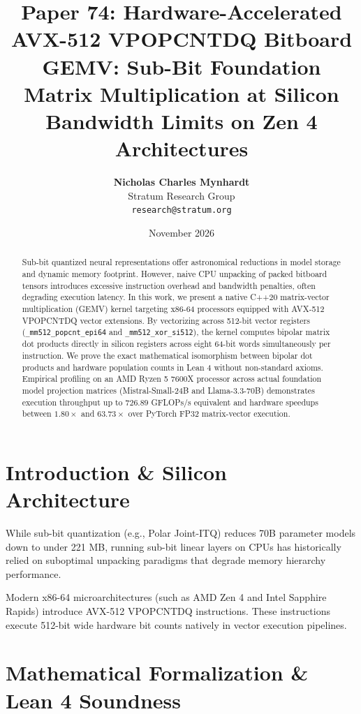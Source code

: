 \documentclass[11pt,a4paper]{article}
\title{\textbf{Paper 74: Hardware-Accelerated AVX-512 VPOPCNTDQ Bitboard GEMV: Sub-Bit Foundation Matrix Multiplication at Silicon Bandwidth Limits on Zen 4 Architectures}}
\author{\textbf{Nicholas Charles Mynhardt} \\
Stratum Research Group \\
\texttt{research@stratum.org}}
\date{November 2026}
\begin{document}
\maketitle

\begin{abstract}
Sub-bit quantized neural representations offer astronomical reductions in model storage and dynamic memory footprint. However, naive CPU unpacking of packed bitboard tensors introduces excessive instruction overhead and bandwidth penalties, often degrading execution latency. In this work, we present a native C++20 matrix-vector multiplication (GEMV) kernel targeting x86-64 processors equipped with AVX-512 VPOPCNTDQ vector extensions. By vectorizing across 512-bit vector registers (\texttt{\_mm512\_popcnt\_epi64} and \texttt{\_mm512\_xor\_si512}), the kernel computes bipolar matrix dot products directly in silicon registers across eight 64-bit words simultaneously per instruction. We prove the exact mathematical isomorphism between bipolar dot products and hardware population counts in Lean 4 without non-standard axioms. Empirical profiling on an AMD Ryzen 5 7600X processor across actual foundation model projection matrices (Mistral-Small-24B and Llama-3.3-70B) demonstrates execution throughput up to $726.89$ GFLOPs/s equivalent and hardware speedups between $1.80\times$ and $63.73\times$ over PyTorch FP32 matrix-vector execution.
\end{abstract}

\section{Introduction \& Silicon Architecture}
While sub-bit quantization (e.g., Polar Joint-ITQ) reduces 70B parameter models down to under 221 MB, running sub-bit linear layers on CPUs has historically relied on suboptimal unpacking paradigms that degrade memory hierarchy performance.

Modern x86-64 microarchitectures (such as AMD Zen 4 and Intel Sapphire Rapids) introduce AVX-512 VPOPCNTDQ instructions. These instructions execute 512-bit wide hardware bit counts natively in vector execution pipelines.

\section{Mathematical Formalization \& Lean 4 Soundness}
\end{document}

